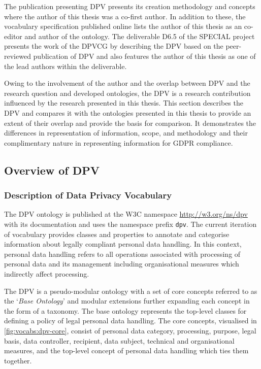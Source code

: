 The publication presenting DPV \cite{pandit_creating_2019} presents its creation methodology and concepts where the author of this thesis was a co-first author.
In addition to these, the vocabulary specification published online lists the author of this thesis as an co-editor and author of the ontology.
The deliverable D6.5 \cite{pandit_d6.5_2019} of the SPECIAL project presents the work of the DPVCG by describing the DPV based on the peer-reviewed publication of DPV \cite{pandit_creating_2019} and also features the author of this thesis as one of the lead authors within the deliverable.

Owing to the involvement of the author and the overlap between DPV and the research question and developed ontologies, the DPV is a research contribution influenced by the research presented in this thesis.
This section describes the DPV and compares it with the ontologies presented in this thesis to provide an extent of their overlap and provide the basis for comparison.
It demonstrates the differences in representation of information, scope, and methodology and their complimentary nature in representing information for GDPR compliance.

\subsection{Overview of DPV}
\subsubsection{Description of Data Privacy Vocabulary}
The DPV ontology is published at the W3C namespace \url{http://w3.org/ns/dpv} with its documentation and uses the namespace prefix \texttt{dpv}. 
The current iteration of vocabulary provides classes and properties to annotate and categorise information about legally compliant personal data handling. In this context, personal data handling refers to all operations associated with processing of personal data and its management including organisational measures which indirectly affect processing.

The DPV is a pseudo-modular ontology with a set of core concepts referred to as the `\textit{Base Ontology}' and modular extensions further expanding each concept in the form of a taxonomy. The base ontology represents the top-level classes for defining a policy of legal personal data handling.
The core concepts, visualised in \autoref{fig:vocabs:dpv-core}, consist of personal data category, processing, purpose, legal basis, data controller, recipient, data subject, technical and organisational measures, and the top-level concept of personal data handling which ties them together.

